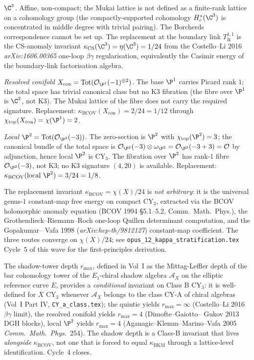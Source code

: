 \emph{$\C^3$.} Affine, non-compact; the Mukai lattice is not
defined as a finite-rank lattice on a cohomology group (the
compactly-supported cohomology $H^*_c(\C^3)$ is concentrated in
middle degree with trivial pairing). The Borcherds
correspondence cannot be set up. The replacement at the boundary
link $T^{1, 1}_{\mathrm{lk}}$ is the CS-anomaly invariant
$\kappa_{\mathrm{CS}}(\C^3) = \eta(\C^3) = 1/24$ from the
Costello--Li 2016 \emph{arXiv:1606.00365} one-loop $\beta\gamma$
regularisation, equivalently the Casimir energy of the
boundary-link factorisation algebra.

\emph{Resolved conifold $X_{\mathrm{con}} =
\mathrm{Tot}(\mathcal{O}_{\P^1}(-1)^{\oplus 2})$.} The base $\P^1$
carries Picard rank $1$; the total space has trivial canonical
class but no K3 fibration (the fibre over $\P^1$ is $\C^2$, not
K3). The Mukai lattice of the fibre does not carry the required
signature. Replacement: $\kappa_{\mathrm{BCOV}}(X_{\mathrm{con}})
= 2/24 = 1/12$ through $\chi_{\mathrm{top}}(X_{\mathrm{con}}) =
\chi(\P^1) = 2$.

\emph{Local $\P^2 = \mathrm{Tot}(\mathcal{O}_{\P^2}(-3))$.} The
zero-section is $\P^2$ with $\chi_{\mathrm{top}}(\P^2) = 3$; the
canonical bundle of the total space is $\mathcal{O}_{\P^2}(-3)
\otimes \omega_{\P^2} = \mathcal{O}_{\P^2}(-3 + 3) =
\mathcal{O}$ by adjunction, hence local $\P^2$ is CY$_3$. The
fibration over $\P^2$ has rank-$1$ fibre $\mathcal{O}_{\P^2}(-3)$,
not K3; no K3 signature $(4, 20)$ is available. Replacement:
$\kappa_{\mathrm{BCOV}}(\text{local } \P^2) = 3/24 = 1/8$.

The replacement invariant $\kappa_{\mathrm{BCOV}} = \chi(X)/24$
is \emph{not arbitrary}: it is the universal genus-$1$
constant-map free energy on compact CY$_3$, extracted via the
BCOV holomorphic anomaly equation (BCOV 1994 \S 5.1--5.2,
Comm.\ Math.\ Phys.), the Grothendieck--Riemann--Roch
one-loop Quillen determinant computation, and the Gopakumar--
Vafa 1998 (\emph{arXiv:hep-th/9812127}) constant-map coefficient.
The three routes converge on $\chi(X)/24$; see
\texttt{opus\_12\_kappa\_stratification.tex} Cycle~5 of this
wave for the first-principles derivation.

The shadow-tower depth $r_{\max}$, defined in Vol~I as the
Mittag-Leffler depth of the bar cohomology tower of the
$E_1$-chiral shadow algebra $\mathcal{A}_X$ on the elliptic
reference curve $E$, provides a \emph{conditional} invariant on
Class B CY$_3$: it is well-defined for $X$ CY$_3$ whenever
$\mathcal{A}_X$ belongs to the class CY-A of chiral algebras
(Vol~I Part IV, \texttt{CY\_a\_class.tex}); the quintic yields
$r_{\max} = \infty$ (Costello--Li 2016 $\beta\gamma$ limit), the
resolved conifold yields $r_{\max} = 4$ (Dimofte--Gaiotto--
Gukov 2013 DGH blocks), local $\P^2$ yields $r_{\max} = 4$
(Aganagic--Klemm--Marino--Vafa 2005 \emph{Comm.\ Math.\ Phys.}~254).
The shadow depth is a Class-B invariant that lives \emph{alongside}
$\kappa_{\mathrm{BCOV}}$, not one that is forced to equal
$\kappa_{\mathrm{BKM}}$ through a lattice-level identification.
Cycle~4 closes.

